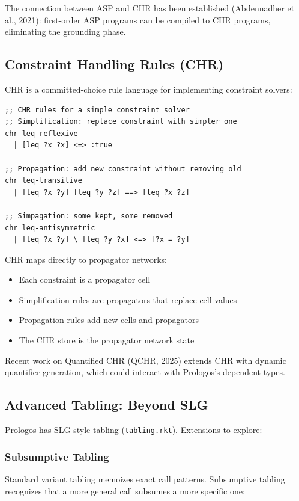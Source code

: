 \documentclass[11pt]{article}
\begin{document}
The connection between ASP and CHR has been established (Abdennadher et al.,
2021): first-order ASP programs can be compiled to CHR programs, eliminating
the grounding phase.
\subsection{Constraint Handling Rules (CHR)}
\label{sec:orgaccfc04}

CHR is a committed-choice rule language for implementing constraint solvers:

\begin{verbatim}
;; CHR rules for a simple constraint solver
;; Simplification: replace constraint with simpler one
chr leq-reflexive
  | [leq ?x ?x] <=> :true

;; Propagation: add new constraint without removing old
chr leq-transitive
  | [leq ?x ?y] [leq ?y ?z] ==> [leq ?x ?z]

;; Simpagation: some kept, some removed
chr leq-antisymmetric
  | [leq ?x ?y] \ [leq ?y ?x] <=> [?x = ?y]
\end{verbatim}

CHR maps directly to propagator networks:
\begin{itemize}
\item Each constraint is a propagator cell
\item Simplification rules are propagators that replace cell values
\item Propagation rules add new cells and propagators
\item The CHR store is the propagator network state
\end{itemize}

Recent work on Quantified CHR (QCHR, 2025) extends CHR with dynamic
quantifier generation, which could interact with Prologos's dependent
types.
\subsection{Advanced Tabling: Beyond SLG}
\label{sec:orgdcce25c}

Prologos has SLG-style tabling (\texttt{tabling.rkt}). Extensions to explore:
\subsubsection{Subsumptive Tabling}
\label{sec:org4d63287}

Standard variant tabling memoizes exact call patterns. Subsumptive tabling
recognizes that a more general call subsumes a more specific one:
\end{document}
